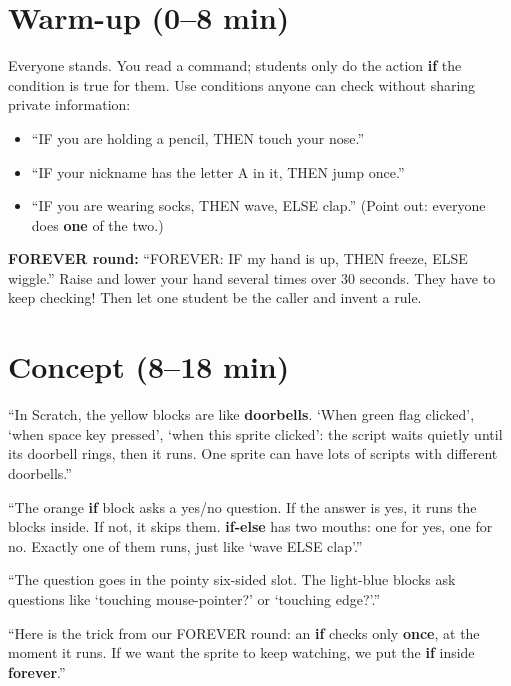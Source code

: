 \section{Warm-up (0--8 min)}
\begin{unplugged}
Everyone stands. You read a command; students only do the action \textbf{if} the condition is true for them. Use conditions anyone can check without sharing private information:
\begin{itemize}[leftmargin=1.2em,itemsep=0pt]
  \item \enquote{IF you are holding a pencil, THEN touch your nose.}
  \item \enquote{IF your nickname has the letter A in it, THEN jump once.}
  \item \enquote{IF you are wearing socks, THEN wave, ELSE clap.} (Point out: everyone does \textbf{one} of the two.)
\end{itemize}
\textbf{FOREVER round:} \enquote{FOREVER: IF my hand is up, THEN freeze, ELSE wiggle.} Raise and lower your hand several times over 30 seconds. They have to keep checking! Then let one student be the caller and invent a rule.
\end{unplugged}

\section{Concept (8--18 min)}
\begin{teacherscript}
\enquote{In Scratch, the yellow  blocks are like \textbf{doorbells}. \enquote{When green flag clicked}, \enquote{when space key pressed}, \enquote{when this sprite clicked}: the script waits quietly until its doorbell rings, then it runs. One sprite can have lots of scripts with different doorbells.}

\enquote{The orange \textbf{if} block asks a yes/no question. If the answer is yes, it runs the blocks inside. If not, it skips them. \textbf{if-else} has two mouths: one for yes, one for no. Exactly one of them runs, just like \enquote{wave ELSE clap}.}

\enquote{The question goes in the pointy six-sided slot. The light-blue  blocks ask questions like \enquote{touching mouse-pointer?} or \enquote{touching edge?}.}

\enquote{Here is the trick from our FOREVER round: an \textbf{if} checks only \textbf{once}, at the moment it runs. If we want the sprite to keep watching, we put the \textbf{if} inside \textbf{forever}.}
\end{teacherscript}

